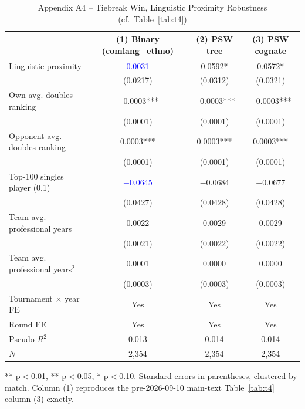 \documentclass[10pt]{article}
\begin{document}
\begin{table}[htbp]
\centering
\caption{Appendix A4 -- Tiebreak Win, Linguistic Proximity Robustness (cf.\ Table~\ref{tab:t4}) \label{tab:a4}}
\begin{threeparttable}
\begin{tabular}{lccc}
\toprule
 & (1) Binary (comlang\_ethno) & (2) PSW tree & (3) PSW cognate \\
\midrule
Linguistic proximity & \textcolor{blue}{0.0031} & 0.0592* & 0.0572* \\
 & (0.0217) & (0.0312) & (0.0321) \\
Own avg. doubles ranking & $-$0.0003*** & $-$0.0003*** & $-$0.0003*** \\
 & (0.0001) & (0.0001) & (0.0001) \\
Opponent avg. doubles ranking & 0.0003*** & 0.0003*** & 0.0003*** \\
 & (0.0001) & (0.0001) & (0.0001) \\
Top-100 singles player (0,1) & \textcolor{blue}{$-$0.0645} & $-$0.0684 & $-$0.0677 \\
 & (0.0427) & (0.0428) & (0.0428) \\
Team avg. professional years & 0.0022 & 0.0029 & 0.0029 \\
 & (0.0021) & (0.0022) & (0.0022) \\
Team avg. professional years$^2$ & 0.0001 & 0.0000 & 0.0000 \\
 & (0.0003) & (0.0003) & (0.0003) \\
\midrule
Tournament $\times$ year FE & Yes & Yes & Yes \\
Round FE & Yes & Yes & Yes \\
Pseudo-$R^2$ & 0.013 & 0.014 & 0.014 \\
$N$ & 2,354 & 2,354 & 2,354 \\
\bottomrule
\end{tabular}
\begin{tablenotes}
\small
\item *** p$<$0.01, ** p$<$0.05, * p$<$0.10. Standard errors in parentheses, clustered by match. Column (1) reproduces the pre-2026-09-10 main-text Table~\ref{tab:t4} column (3) exactly.
\end{tablenotes}
\end{threeparttable}
\end{table}
\FloatBarrier
\end{document}
